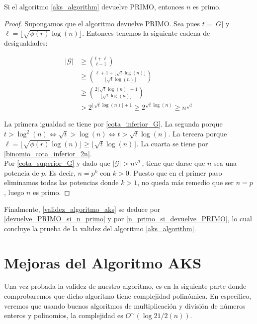 \begin{lema}\label{n_primo_si_devuelve_PRIMO}
	Si el algoritmo \autoref{aks_algorithm} devuelve PRIMO, entonces $n$ es primo. 
\end{lema}

\begin{proof}
	Supongamos que el algoritmo devuelve PRIMO. Sea pues $t = |G|$ y $\ell = \lfloor \sqrt{\phi(r)}\log(n) \rfloor$. Entonces tenemos la siguiente cadena de desigualdades:
	
	\begin{align}
	|\mathcal{G}| &\geq \binom{t + \ell}{t - 1}\\
	&\geq \binom{\ell + 1 + \lfloor \sqrt{t}\log(n) \rfloor}{\lfloor \sqrt{t}\log(n) \rfloor}\\
	&\geq \binom{2\lfloor \sqrt{t}\log(n) \rfloor + 1}{\lfloor \sqrt{t}\log(n) \rfloor}\\
	&> 2^{\lfloor \sqrt{t}\log(n) \rfloor + 1} \geq 2^{\sqrt{t}\log(n)} \geq n^{\sqrt{t}}
	\end{align}
	
	La primera igualdad se tiene por \autoref{cota_inferior_G}. La segunda porque $t > \log^2(n) \Leftrightarrow \sqrt{t} > \log(n) \Leftrightarrow t > \sqrt{t}\log(n)$. La tercera porque $\ell = \lfloor \sqrt{\phi(r)}\log(n) \rfloor \geq \lfloor \sqrt{t}\log(n) \rfloor$. La cuarta se tiene por \autoref{binomio_cota_inferior_2n}.\\
	
	Por \autoref{cota_superior_G} y dado que $|\mathcal{G}| > n^{\sqrt{t}}$, tiene que darse que $n$ sea una potencia de $p$. Es decir, $n = p^k$ con $k > 0$. Puesto que en el primer paso eliminamos todas las potencias donde $k > 1$, no queda más remedio que ser $n = p$, luego $n$ es primo.
\end{proof}

Finalmente, \autoref{validez_algoritmo_aks} se deduce por \autoref{devuelve_PRIMO_si_n_primo} y por \autoref{n_primo_si_devuelve_PRIMO}, lo cual concluye la prueba de la validez del algoritmo \autoref{aks_algorithm}.

\section{Mejoras del Algoritmo AKS}

Una vez probada la validez de nuestro algoritmo, es en la siguiente parte donde comprobaremos que dicho algoritmo tiene complejidad polinómica. En específico, veremos que usando buenos algoritmos de multiplicación y división de números enteros y polinomios, la complejidad es $O^\sim(\log{21/2}(n))$.\\

